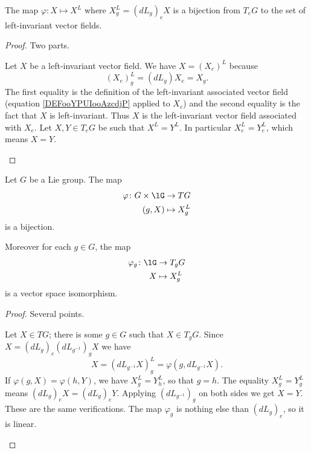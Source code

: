 \begin{theorem}
	The map \( \varphi\colon X\mapsto X^L\) where \( X^L_g=(dL_g)_eX\) is a bijection from \( T_eG\) to the set of left-invariant vector fields.
\end{theorem}

\begin{proof}
	Two parts.
	\begin{subproof}
		\spitem[Surjective]
		Let \( X\) be a left-invariant vector field. We have \( X=(X_e)^L\) because
		\begin{equation}
			(X_e)^L_g=(dL_g)X_e=X_g.
		\end{equation}
		The first equality is the definition of the left-invariant associated vector field (equation \eqref{DEFooYPUIooAzcdjP} applied to \( X_e\)) and the second equality is the fact that \( X\) is left-invariant. Thus \( X\) is the left-invariant vector field associated with \( X_e\).
		\spitem[Injective]
		Let \( X,Y\in T_eG\) be such that \( X^L=Y^L\). In particular \( X^L_e=Y^L_e\), which means \( X=Y\).
	\end{subproof}
\end{proof}

\begin{proposition}
	Let \( G\) be a Lie group. The map
	\begin{equation}
		\begin{aligned}
			\varphi\colon G\times \lG & \to TG        \\
			(g,X)                     & \mapsto X^L_g
		\end{aligned}
	\end{equation}
	is a bijection.

	Moreover for each \( g\in G\), the map
	\begin{equation}
		\begin{aligned}
			\varphi_g\colon \lG & \to T_gG      \\
			X                   & \mapsto X^L_g
		\end{aligned}
	\end{equation}
	is a vector space isomorphism.
\end{proposition}

\begin{proof}
	Several points.
	\begin{subproof}
		Let \( X\in TG\); there is some \( g\in G\) such that \( X\in T_gG\). Since \( X=(dL_g)_e(dL_{g^{-1}})_gX\) we have
		\begin{equation}
			X=(dL_{g^{-1}}X)^L_g=\varphi(g,dL_{g^{-1}}X).
		\end{equation}
		If \( \varphi(g,X)=\varphi(h,Y)\), we have \( X_g^L=Y^L_h\), so that \( g=h\). The equality  \( X_g^L=Y_g^L\) means \( (dL_g)_eX=(dL_g)_eY\). Applying \( (dL_{g^{-1}})_g\) on both sides we get \( X=Y\).
		These are the same verifications.
		The map \( \varphi_g\) is nothing else than \( (dL_g)_e\), so it is linear.
	\end{subproof}
\end{proof}


